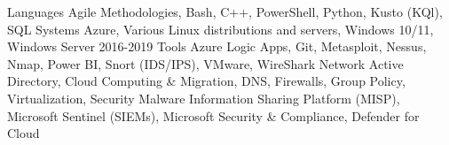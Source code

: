 \begin{cvskills}
  \cvskill
    {Languages} %
    {Agile Methodologies, Bash, C++, PowerShell, Python, Kusto (KQl), SQL}
  \cvskill
    {Systems} %
    {Azure, Various Linux distributions and servers, Windows 10/11, Windows Server 2016-2019}
  \cvskill
     {Tools}
     {Azure Logic Apps, Git, Metasploit, Nessus, Nmap, Power BI, Snort (IDS/IPS), VMware, WireShark}
  \cvskill
     {Network}
     {Active Directory, Cloud Computing \& Migration, DNS, Firewalls, Group Policy, Virtualization,}
  \cvskill
     {Security}
     {Malware Information Sharing Platform (MISP), Microsoft Sentinel (SIEMs), Microsoft Security \& Compliance, Defender for Cloud}
\end{cvskills}
